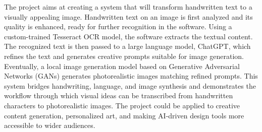 
The project aims at creating a system that will transform handwritten text to a visually appealing image. Handwritten text on an image is first analyzed and its quality is enhanced, ready for further recognition in the software. Using a custom-trained Tesseract OCR model, the software extracts the textual content. The recognized text is then passed to a large language model, ChatGPT, which refines the text and generates creative prompts suitable for image generation. Eventually, a local image generation model based on  Generative Adversarial Networks (GANs) generates photorealistic images matching refined prompts. This system bridges handwriting, language, and image synthesis and demonstrates the workflow through which visual ideas can be transcribed from handwritten characters to photorealistic images. The project could be applied to creative content generation, personalized art, and making AI-driven design tools more accessible to wider audiences.